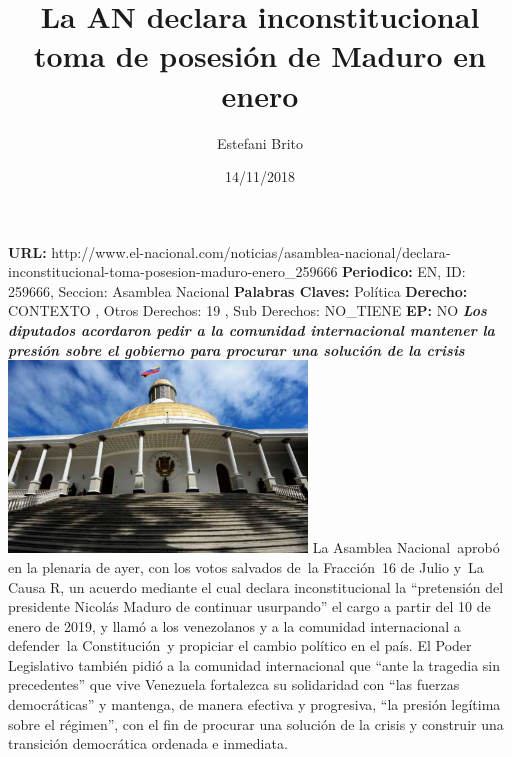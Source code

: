 \documentclass{article}%
\title{\textbf{La AN declara inconstitucional toma de posesión de Maduro en enero}}%
\author{Estefani Brito}%
\date{14/11/2018}%
\begin{document}
%
\normalsize%
\maketitle%
\textbf{URL: }%
http://www.el{-}nacional.com/noticias/asamblea{-}nacional/declara{-}inconstitucional{-}toma{-}posesion{-}maduro{-}enero\_259666\newline%
%
\textbf{Periodico: }%
EN, %
ID: %
259666, %
Seccion: %
Asamblea Nacional\newline%
%
\textbf{Palabras Claves: }%
Política\newline%
%
\textbf{Derecho: }%
CONTEXTO%
, Otros Derechos: %
19%
, Sub Derechos: %
NO\_TIENE%
\newline%
%
\textbf{EP: }%
NO\newline%
\newline%
%
\textbf{\textit{Los diputados acordaron pedir a la comunidad internacional mantener la presión sobre el gobierno para procurar una solución de la crisis}}%
\newline%
\newline%
%
\includegraphics[width=300px]{39.jpg}%
\newline%
%
La Asamblea Nacional~aprobó en la plenaria de ayer, con los votos salvados de~la Fracción~16 de Julio y~La Causa R, un acuerdo mediante el cual declara inconstitucional la “pretensión del presidente Nicolás Maduro de continuar usurpando” el cargo a partir del 10 de enero de 2019, y llamó a los venezolanos y a la comunidad internacional a defender~la Constitución~y propiciar el cambio político en el país.%
\newline%
%
El Poder Legislativo también pidió a la comunidad internacional que “ante la tragedia sin precedentes” que vive Venezuela fortalezca su solidaridad con “las fuerzas democráticas” y mantenga, de manera efectiva y progresiva, “la presión legítima sobre el régimen”, con el fin de procurar una solución de la crisis y construir una transición democrática ordenada e inmediata.%
\newline%
%
\end{document}

